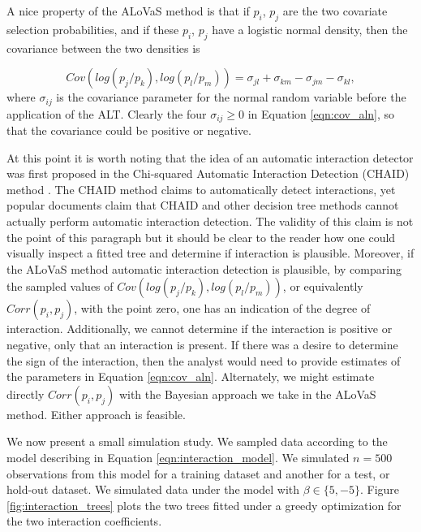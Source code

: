 A nice property of the ALoVaS method is that if $p_i$, $p_j$ are the two covariate selection probabilities, and if these $p_i$, $p_j$ have a logistic normal density, then the covariance between the two densities is 

\begin{equation}\label{eqn:cov_aln}
Cov(log(p_j / p_k), log(p_l / p_m) ) = \sigma_{jl} + \sigma_{km} - \sigma_{jm} - \sigma_{kl},
\end{equation}
where $\sigma_{ij}$ is the covariance parameter for the normal random variable before the application of the ALT. Clearly the four $\sigma_{ij} \geq 0$ in Equation \ref{eqn:cov_aln}, so that the covariance could be positive or negative.  

At this point it is worth noting that the idea of an automatic interaction detector was first proposed in the Chi-squared Automatic Interaction Detection (CHAID) method \cite{kass1975significance}. The CHAID method claims to automatically detect interactions, yet popular documents \cite{ville2006decision} claim that CHAID and other decision tree methods cannot actually perform automatic interaction detection. The validity of this claim is not the point of this paragraph but it should be clear to the reader how one could visually inspect a fitted tree and determine if interaction is plausible. Moreover, if the ALoVaS method automatic interaction detection is plausible, by comparing the sampled values of $Cov(log(p_j/p_k), log(p_l/p_m) )$, or equivalently $Corr(p_i, p_j)$, with the point zero, one has an indication of the degree of interaction. Additionally, we cannot determine if the interaction is positive or negative, only that an interaction is present. If there was a desire to determine the sign of the interaction, then the analyst would need to provide estimates of the parameters in Equation \ref{eqn:cov_aln}. Alternately, we might estimate directly $Corr(p_i, p_j)$ with the Bayesian approach we take in the ALoVaS method. Either approach is feasible. 

We now present a small simulation study. We sampled data according to the model describing in Equation \ref{eqn:interaction_model}. We simulated $n=500$ observations from this model for a training dataset and another for a test, or hold-out dataset. We simulated data under the model with $\beta \in \{5, -5\}$. Figure \ref{fig:interaction_trees} plots the two trees fitted under a greedy optimization for the two interaction coefficients. 

